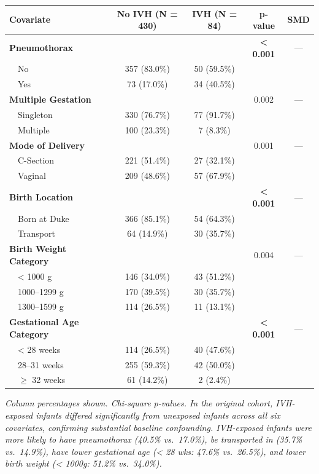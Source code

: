 \documentclass[
]{article}
\begin{document}
\begin{longtable}[]{@{}lcccc@{}}
\toprule
Covariate & No IVH (N = 430) & IVH (N = 84) & p-value & SMD \\
\midrule
\endhead
\textbf{Pneumothorax} & & & \textbf{\textless{} 0.001} & --- \\
 No & 357 (83.0\%) & 50 (59.5\%) & & \\
 Yes & 73 (17.0\%) & 34 (40.5\%) & & \\
\textbf{Multiple Gestation} & & & 0.002 & --- \\
 Singleton & 330 (76.7\%) & 77 (91.7\%) & & \\
 Multiple & 100 (23.3\%) & 7 (8.3\%) & & \\
\textbf{Mode of Delivery} & & & 0.001 & --- \\
 C-Section & 221 (51.4\%) & 27 (32.1\%) & & \\
 Vaginal & 209 (48.6\%) & 57 (67.9\%) & & \\
\textbf{Birth Location} & & & \textbf{\textless{} 0.001} & --- \\
 Born at Duke & 366 (85.1\%) & 54 (64.3\%) & & \\
 Transport & 64 (14.9\%) & 30 (35.7\%) & & \\
\textbf{Birth Weight Category} & & & 0.004 & --- \\
 \textless{} 1000 g & 146 (34.0\%) & 43 (51.2\%) & & \\
 1000--1299 g & 170 (39.5\%) & 30 (35.7\%) & & \\
 1300--1599 g & 114 (26.5\%) & 11 (13.1\%) & & \\
\textbf{Gestational Age Category} & & & \textbf{\textless{} 0.001} &
--- \\
 \textless{} 28 weeks & 114 (26.5\%) & 40 (47.6\%) & & \\
 28--31 weeks & 255 (59.3\%) & 42 (50.0\%) & & \\
 \(\geq\) 32 weeks & 61 (14.2\%) & 2 (2.4\%) & & \\
\bottomrule
\end{longtable}

\emph{Column percentages shown. Chi-square p-values. In the original
cohort, IVH-exposed infants differed significantly from unexposed
infants across all six covariates, confirming substantial baseline
confounding. IVH-exposed infants were more likely to have pneumothorax
(40.5\% vs.~17.0\%), be transported in (35.7\% vs.~14.9\%), have lower
gestational age (\textless{} 28 wks: 47.6\% vs.~26.5\%), and lower birth
weight (\textless{} 1000g: 51.2\% vs.~34.0\%).}
\end{document}
